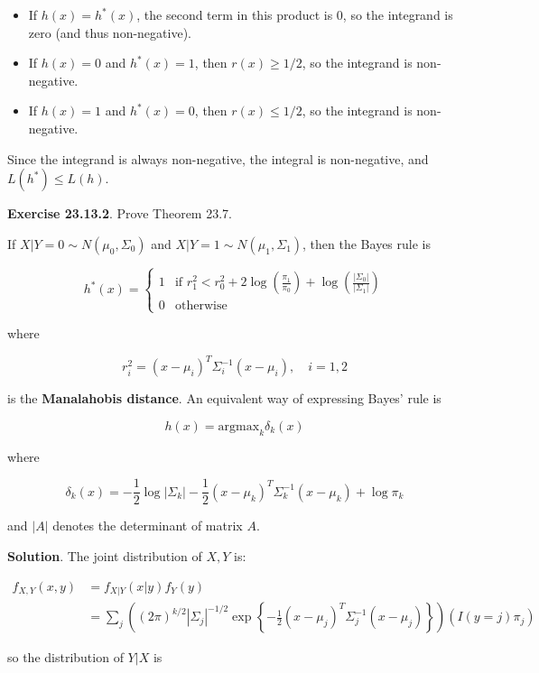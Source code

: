 \begin{itemize}[tightlist]
\item
  If \(h(x) = h^*(x)\), the second term in this product is 0, so the
  integrand is zero (and thus non-negative).
\item
  If \(h(x) = 0\) and \(h^*(x) = 1\), then \(r(x) \geq 1/2\), so the
  integrand is non-negative.
\item
  If \(h(x)= 1\) and \(h^*(x) = 0\), then \(r(x) \leq 1/2\), so the
  integrand is non-negative.
\end{itemize}

Since the integrand is always non-negative, the integral is
non-negative, and \(L(h^*) \leq L(h)\).

\textbf{Exercise 23.13.2}. Prove Theorem 23.7.

If \(X | Y = 0 \sim N(\mu_{0}, \Sigma_{0})\) and
\(X | Y = 1 \sim N(\mu_{1}, \Sigma_{1})\), then the Bayes rule is

\[
h^*(x) = \begin{cases}
1 & \text{if } r_{1}^{2} < r_{0}^{2} + 2 \log \left( \frac{\pi_{1}}{\pi_{0}} \right) + \log \left( \frac{| \Sigma_{0} | }{ | \Sigma_{1}| }
\right) \\
0 & \text{otherwise} 
\end{cases}
\]

where

\[ r_{i}^{2} = (x - \mu_{i})^T \Sigma_{i}^{-1}(x - \mu_{i}), \quad i = 1, 2 \]

is the \textbf{Manalahobis distance}. An equivalent way of expressing
Bayes' rule is

\[ h(x) = \text{argmax}_{k} \delta_{k}(x) \]

where

\[ \delta_{k}(x) = -\frac{1}{2} \log | \Sigma_{k} | - \frac{1}{2} (x - \mu_{k})^T \Sigma_{k}^{-1} (x - \mu_{k}) + \log \pi_{k} \]

and \(|A|\) denotes the determinant of matrix \(A\).

\textbf{Solution}. The joint distribution of \(X, Y\) is:

\begin{align*}
f_{X, Y}(x, y) &= f_{X | Y}(x | y) f_Y(y) \\
&= \sum_{j} \left( (2 \pi)^{k / 2} |\Sigma_{j}|^{-1/2} \exp \left\{ -\frac{1}{2} (x - \mu_{j})^T \Sigma_{j}^{-1} (x - \mu_{j}) \right\} \right) \left( I(y = j) \pi_{j} \right)
\end{align*}

so the distribution of \(Y | X\) is


